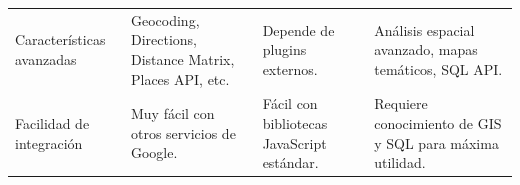 \begin{table}[h]
\begin{tabular}{p{3cm} p{3cm} p{2.5cm} p{2.5cm} }
        Características avanzadas & Geocoding, Directions, Distance Matrix, Places API, etc. & Depende de plugins externos. & Análisis espacial avanzado, mapas temáticos, SQL API. \\
        
        Facilidad de integración & Muy fácil con otros servicios de Google. & Fácil con bibliotecas JavaScript estándar. & Requiere conocimiento de GIS y SQL para máxima utilidad. \\
    \bottomrule
    \end{tabular}
    \label{tabla:comparativa_api_mapas}
\end{table}
